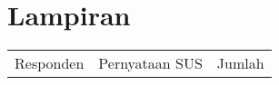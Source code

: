 \chapter*{Lampiran}
\begin{landscape}
	\begin{flushleft}
	\end{flushleft}
	
	\begin{longtable}{|c|c|c|c|c|c|c|c|c|c|c|c|}
		
		\hline
		\multirow{2}{*}{Responden} & \multicolumn{10}{c|}{Pernyataan SUS} & 
		\multirow{2}{*}{Jumlah} \\
		

\end{longtable}
\end{landscape}
